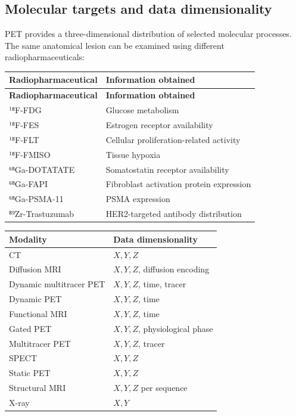 \subsection{Molecular targets and data dimensionality}
PET provides a three-dimensional distribution of selected molecular processes. The same anatomical lesion can be examined using different radiopharmaceuticals:
\begin{longtable}{@{}p{}p{}@{}}
\toprule
\textbf{Radiopharmaceutical} & \textbf{Information obtained} \\
\midrule
\endfirsthead
\toprule
\textbf{Radiopharmaceutical} & \textbf{Information obtained} \\
\midrule
\endhead
¹⁸F-FDG & Glucose metabolism \\
¹⁸F-FES & Estrogen receptor availability \\
¹⁸F-FLT & Cellular proliferation-related activity \\
¹⁸F-FMISO & Tissue hypoxia \\
⁶⁸Ga-DOTATATE & Somatostatin receptor availability \\
⁶⁸Ga-FAPI & Fibroblast activation protein expression \\
⁶⁸Ga-PSMA-11 & PSMA expression \\
⁸⁹Zr-Trastuzumab & HER2-targeted antibody distribution \\
\bottomrule
\end{longtable}

\begin{center}
\begin{tabular}{@{}ll@{}}
\toprule
\textbf{Modality} & \textbf{Data dimensionality} \\
\midrule
CT & $X, Y, Z$ \\
Diffusion MRI & $X, Y, Z$, diffusion encoding \\
Dynamic multitracer PET & $X, Y, Z$, time, tracer \\
Dynamic PET & $X, Y, Z$, time \\
Functional MRI & $X, Y, Z$, time \\
Gated PET & $X, Y, Z$, physiological phase \\
Multitracer PET & $X, Y, Z$, tracer \\
SPECT & $X, Y, Z$ \\
Static PET & $X, Y, Z$ \\
Structural MRI & $X, Y, Z$ per sequence \\
X-ray & $X, Y$ \\
\bottomrule
\end{tabular}
\end{center}

